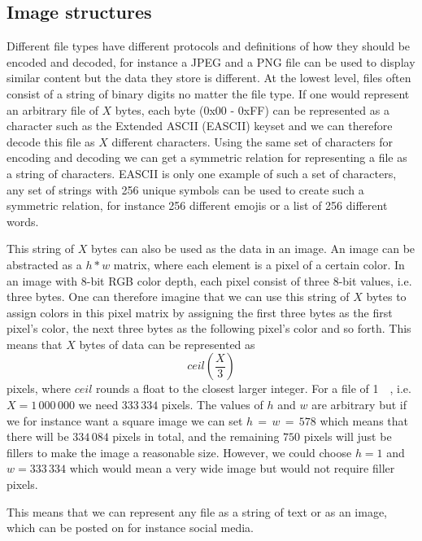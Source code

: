 \subsection{Image structures}
Different file types have different protocols and definitions of how they should be encoded and decoded, for instance a JPEG and a PNG file can be used to display similar content but the data they store is different. At the lowest level, files often consist of a string of binary digits no matter the file type. If one would represent an arbitrary file of $X$ bytes, each byte (0x00 - 0xFF) can be represented as a character such as the Extended ASCII (EASCII) keyset and we can therefore decode this file as $X$ different characters. Using the same set of characters for encoding and decoding we can get a symmetric relation for representing a file as a string of characters. EASCII is only one example of such a set of characters, any set of strings with 256 unique symbols can be used to create such a symmetric relation, for instance 256 different emojis or a list of 256 different words.

This string of $X$ bytes can also be used as the data in an image. An image can be abstracted as a $h * w$ matrix, where each element is a pixel of a certain color. In an image with 8-bit RGB color depth, each pixel consist of three 8-bit values, i.e. three bytes. One can therefore imagine that we can use this string of $X$ bytes to assign colors in this pixel matrix by assigning the first three bytes as the first pixel's color, the next three bytes as the following pixel's color and so forth. This means that $X$ bytes of data can be represented as 
$$ceil(\frac{X}{3})$$ 
pixels, where $ceil$ rounds a float to the closest larger integer. For a file of \SI{1}{\mega\byte}, i.e. $X = 1\,000\,000$ we need $333\,334$ pixels. The values of $h$ and $w$ are arbitrary but if we for instance want a square image we can set $ h\,=\,w\,=\,578$ which means that there will be $334\,084$ pixels in total, and the remaining $750$ pixels will just be fillers to make the image a reasonable size. However, we could choose $h = 1$ and $w = 333\,334$ which would mean a very wide image but would not require filler pixels. 

This means that we can represent any file as a string of text or as an image, which can be posted on for instance social media. 

